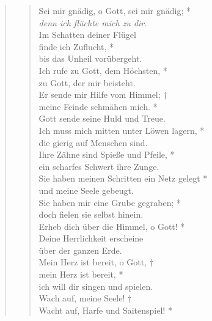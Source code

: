 \vspace{0.6cm}
\def\greinitialformat#1{{\fontsize{40}{40}\selectfont #1}}
\gresetfirstlineaboveinitial{\small \textcolor{red}{Ps 57}}{}
\setaboveinitialseparation{0.72mm}

\vspace{0.6cm}

\begin{quote}
\begin{verse}
 Sei mir gnädig, o Gott, sei mir gnädig; *\\
\textit{denn ich flüchte mich zu dir.}\\ 
\vin Im Schatten deiner Flügel\\ 
\vin finde ich Zuflucht, *\\ 
\vin bis das Unheil vorübergeht.\\ 
Ich rufe zu Gott, dem Höchsten, *\\
zu Gott, der mir beisteht.\\ 
\vin Er sende mir Hilfe vom Himmel; †\\ 
\vin meine Feinde schmähen mich. *\\ 
\vin Gott sende seine Huld und Treue.\\
Ich muss mich mitten unter Löwen lagern, *\\
die gierig auf Menschen sind.\\ 
\vin Ihre Zähne sind Spieße und Pfeile, *\\ 
\vin ein scharfes Schwert ihre Zunge.\\ 
Sie haben meinen Schritten ein Netz gelegt *\\ 
und meine Seele gebeugt.\\ 
\vin Sie haben mir eine Grube gegraben; *\\ 
\vin doch fielen sie selbst hinein.\\
Erheb dich über die Himmel, o Gott! *\\
Deine Herrlichkeit erscheine\\
über der ganzen Erde.\\
\vin Mein Herz ist bereit, o Gott, †\\ 
\vin mein Herz ist bereit, *\\ 
\vin ich will dir singen und spielen.\\ 
Wach auf, meine Seele! †\\
Wacht auf, Harfe und Saitenspiel! *\\ 

\end{verse}
\end{quote}
